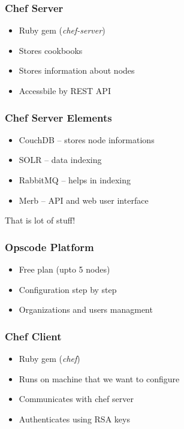 \documentclass[16pt]{beamer}
\begin{document}
\begin{frame}
  \frametitle{Chef Server}
  \begin{itemize}
    \item Ruby gem (\emph{chef-server})
    \item Stores cookbooks
    \item Stores information about nodes
    \item Accessbile by REST API
  \end{itemize}
\end{frame}

\begin{frame}
  \frametitle{Chef Server Elements}
  \begin{itemize}
    \item CouchDB -- stores node informations
    \item SOLR -- data indexing
    \item RabbitMQ -- helps in indexing
    \item Merb -- API and web user interface
  \end{itemize}
  \pause
  \begin{center}
    \LARGE \color{red} That is lot of stuff!
  \end{center}
\end{frame}

\begin{frame}
  \frametitle{Opscode Platform}
  \begin{itemize}
    \item Free plan (upto 5 nodes)
    \item Configuration step by step
    \item Organizations and users managment
  \end{itemize}
\end{frame}

\begin{frame}
  \frametitle{Chef Client}
  \begin{itemize}
    \item Ruby gem (\emph{chef})
    \item Runs on machine that we want to configure
    \item Communicates with chef server
    \item Authenticates using RSA keys
  \end{itemize}
\end{frame}
\end{document}
